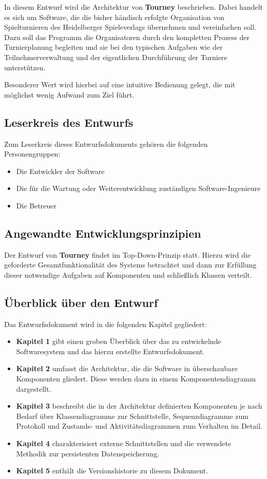 \documentclass[11pt]{article}
\begin{document}
In diesem Entwurf wird die Architektur von \textbf{Tourney} beschrieben. Dabei handelt es sich um Software, die die bisher händisch erfolgte Organisation von Spielturnieren des Heidelberger Spieleverlags übernehmen und vereinfachen soll. Dazu soll das Programm die Organisatoren durch den kompletten Prozess der Turnierplanung begleiten und sie bei den typischen Aufgaben wie der Teilnehmerverwaltung und der eigentlichen Durchführung der Turniere unterstützen.

Besonderer Wert wird hierbei auf eine intuitive Bedienung gelegt, die mit möglichst wenig Aufwand zum Ziel führt.

\subsection{Leserkreis des Entwurfs}

Zum Leserkreis dieses Entwurfsdokuments gehören die folgenden Personengruppen:
\begin{itemize}
	\item Die Entwickler der Software
	\item Die für die Wartung oder Weiterentwicklung zuständigen Software-Ingenieure
	\item Die Betreuer
\end{itemize}

\subsection{Angewandte Entwicklungsprinzipien}

Der Entwurf von \textbf{Tourney} findet im Top-Down-Prinzip statt. Hierzu wird die geforderte Gesamtfunktionalität des Systems betrachtet und dann zur Erfüllung dieser notwendige Aufgaben auf Komponenten und schließlich Klassen verteilt.

\subsection{Überblick über den Entwurf}

Das Entwurfsdokument wird in die folgenden Kapitel gegliedert:
\begin{itemize}
	\item[] \textbf{Kapitel 1} gibt einen groben Überblick über das zu entwickelnde Softwaresystem und das hierzu erstellte Entwurfsdokument.
	\item[] \textbf{Kapitel 2} umfasst die Architektur, die die Software in überschaubare Komponenten gliedert. Diese werden dazu in einem Komponentendiagramm dargestellt.
	\item[] \textbf{Kapitel 3} beschreibt die in der Architektur definierten Komponenten je nach Bedarf über Klassendiagramme zur Schnittstelle, Sequenzdiagramme zum Protokoll und Zustands- und Aktivitätsdiagrammen zum Verhalten im Detail.
	\item[] \textbf{Kapitel 4} charakterisiert externe Schnittstellen und die verwendete Methodik zur persistenten Datenspeicherung.
	\item[] \textbf{Kapitel 5} enthält die Versionshistorie zu diesem Dokument.
\end{itemize}
\end{document}
